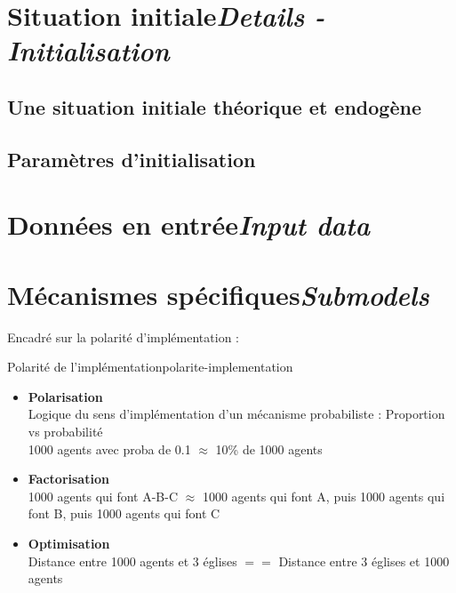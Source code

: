 \section[Situation initiale -- \textit{Details - Initialisation}]{Situation initiale\protect\newline \large{\textit{Details - Initialisation}}  \label{sec:initialisation}}

\subsection{Une situation initiale théorique et endogène}

\subsection{Paramètres d'initialisation}

\section[Données en entrée -- \textit{Input data}]{Données en entrée\protect\newline \large{\textit{Input data}} }


\section[Mécanismes spécifiques -- \textit{Submodels}]{Mécanismes spécifiques\protect\newline \large{\textit{Submodels}}  \label{sec:meca-specifiques}}

Encadré sur la polarité d'implémentation : 


\begin{encadre}{Polarité de l'implémentation}{polarite-implementation}

\begin{itemize}
	\item \textbf{Polarisation}\\
	Logique du sens d'implémentation d'un mécanisme probabiliste : Proportion vs probabilité \\
	1000 agents avec proba de 0.1 $\approx$ 10\% de 1000 agents
	
	\item \textbf{Factorisation}\\
	1000 agents qui font A-B-C $\approx$ 1000 agents qui font A, puis 1000 agents qui font B, puis 1000 agents qui font C
	
	\item \textbf{Optimisation}\\
	Distance entre 1000 agents et 3 églises $==$ Distance entre 3 églises et 1000 agents
\end{itemize}	
\end{encadre}

